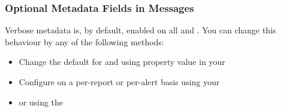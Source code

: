 \documentclass[letterpaper,10pt,english]{sphinxmanual}
\begin{document}
\subsubsection{Optional Metadata Fields in Messages}
\label{\detokenize{configuration:optional-metadata-fields-in-messages}}
Verbose metadata is, by default, enabled on all  and .
You can change this behaviour by any of the following methods:
\begin{itemize}
\item {} 
Change the default for   and  using  property value in your {\hyperref[\detokenize{usage:solution-studio-package}]{}}

\item {} 
Configure on a per-report or per-alert basis using your {\hyperref[\detokenize{configuration:configfile}]{}}

\item {} 
or using the {\hyperref[\detokenize{otaapi:to-mobile-messages}]{}}

\end{itemize}
\end{document}
